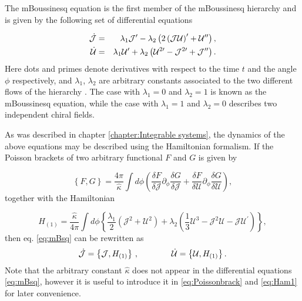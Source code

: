\documentclass[letterpaper,11pt,oneside]{book}
\begin{document}
The mBoussinesq equation is the first member of the mBoussinesq hierarchy
and is given by the following set of differential equations

\begin{eqnarray}
	\dot{\mathcal{J}} & = & \lambda_{1}\mathcal{J}^{\prime}-\lambda_{2}\left(2\left(\mathcal{J}\mathcal{U}\right)^{\prime}+\mathcal{U}^{\prime\prime}\right),\nonumber \\
	\dot{{\cal U}} & = & \lambda_{1}\mathcal{U}^{\prime}+\lambda_{2}\left(\mathcal{U}^{2\prime}-\mathcal{J}^{2\prime}+\mathcal{J}^{\prime\prime}\right).\label{eq:mBsq}
\end{eqnarray}
Here dots and primes denote derivatives with respect to the time $t$
and the angle $\phi$ respectively, and $\lambda_{1}$, $\lambda_{2}$
are arbitrary constants associated to the two different flows of the
hierarchy \cite{Fordy:1981}. The case with $\lambda_{1}=0$ and $\lambda_{2}=1$
is known as the mBoussinesq equation, while the case with $\lambda_{1}=1$
and $\lambda_{2}=0$ describes two independent chiral fields.

As was described in chapter \ref{chapter:Integrable systems}, the dynamics
of the above equations may be described using the Hamiltonian formalism.
If the Poisson brackets of two arbitrary functional $F$ and $G$
is given by

\begin{equation}
	\left\{ F,G\right\} =\frac{4\pi}{\hat{\kappa}}\int d\phi\left(\frac{\delta F}{\delta\mathcal{J}}\partial_{\phi}\frac{\delta G}{\delta\mathcal{J}}+\frac{\delta F}{\delta\mathcal{U}}\partial_{\phi}\frac{\delta G}{\delta\mathcal{U}}\right),\label{eq:Poissonbrack}
\end{equation}
together with the Hamiltonian

\begin{equation}
	H_{\left(1\right)}=\frac{\hat{\kappa}}{4\pi}\int d\phi\left\{ \frac{\lambda_{1}}{2}\left(\mathcal{J}^{2}+\mathcal{U}^{2}\right)+\lambda_{2}\left(\frac{1}{3}\mathcal{U}^{3}-\mathcal{J}^{2}\mathcal{U}-\mathcal{J}\mathcal{U}^{\prime}\right)\right\} ,\label{eq:Ham1}
\end{equation}
then eq. \eqref{eq:mBsq} can be rewritten as
\[
\dot{\mathcal{J}}=\left\{ \mathcal{J},H_{\left(1\right)}\right\} \,,\qquad\qquad\dot{{\cal U}}=\left\{ {\cal U},H_{\left(1\right)}\right\} .
\]
Note that the arbitrary constant $\hat{\kappa}$ does not appear in
the differential equations \eqref{eq:mBsq}, however it is useful
to introduce it in \eqref{eq:Poissonbrack} and \eqref{eq:Ham1} for
later convenience.
\end{document}
